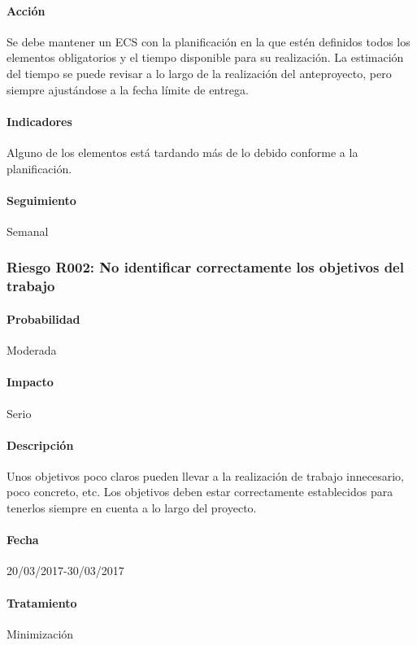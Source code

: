 \documentclass[10pt,a4paper]{article}
\begin{document}
				\paragraph{Acción} Se debe mantener un ECS con la planificación en la que estén definidos todos los elementos obligatorios y el tiempo disponible para su realización. La estimación del tiempo se puede revisar a lo largo de la realización del anteproyecto, pero siempre ajustándose a la fecha límite de entrega. %
				\paragraph{Indicadores} Alguno de los elementos está tardando más de lo debido conforme a la planificación. %
				\paragraph{Seguimiento}	Semanal %
	
            \subsubsection{Riesgo R002: No identificar correctamente los objetivos del trabajo}
				\paragraph{Probabilidad} Moderada
				\paragraph{Impacto}	Serio
				\paragraph{Descripción} Unos objetivos poco claros pueden llevar a la realización de trabajo innecesario, poco concreto, etc. Los objetivos deben estar correctamente establecidos para tenerlos siempre en cuenta a lo largo del proyecto.
				\paragraph{Fecha} 20/03/2017-30/03/2017 %
				\paragraph{Tratamiento} Minimización %
\end{document}
